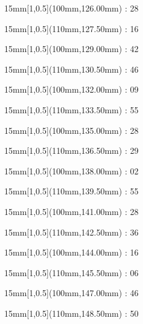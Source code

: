 \documentclass[a4paper]{memoir}
\begin{document}
\begin{textblock*}{15mm}[1,0.5](100mm,126.00mm) : 28\end{textblock*}
\begin{textblock*}{15mm}[1,0.5](110mm,127.50mm) : 16\end{textblock*}
\begin{textblock*}{15mm}[1,0.5](100mm,129.00mm) : 42\end{textblock*}
\begin{textblock*}{15mm}[1,0.5](110mm,130.50mm) : 46\end{textblock*}
\begin{textblock*}{15mm}[1,0.5](100mm,132.00mm) : 09\end{textblock*}
\begin{textblock*}{15mm}[1,0.5](110mm,133.50mm) : 55\end{textblock*}
\begin{textblock*}{15mm}[1,0.5](100mm,135.00mm) : 28\end{textblock*}
\begin{textblock*}{15mm}[1,0.5](110mm,136.50mm) : 29\end{textblock*}
\begin{textblock*}{15mm}[1,0.5](100mm,138.00mm) : 02\end{textblock*}
\begin{textblock*}{15mm}[1,0.5](110mm,139.50mm) : 55\end{textblock*}
\begin{textblock*}{15mm}[1,0.5](100mm,141.00mm) : 28\end{textblock*}
\begin{textblock*}{15mm}[1,0.5](110mm,142.50mm) : 36\end{textblock*}
\begin{textblock*}{15mm}[1,0.5](100mm,144.00mm) : 16\end{textblock*}
\begin{textblock*}{15mm}[1,0.5](110mm,145.50mm) : 06\end{textblock*}
\begin{textblock*}{15mm}[1,0.5](100mm,147.00mm) : 46\end{textblock*}
\begin{textblock*}{15mm}[1,0.5](110mm,148.50mm) : 50\end{textblock*}
\end{document}
